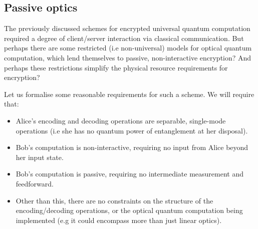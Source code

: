 \documentclass[aps,rmp,twocolumn,amsmath,amssymb,nofootinbib,superscriptaddress,longbibliography,floatfix,table-of-contents,eqsecnum]{revtex4-1}
\begin{document}
\subsection{Passive optics} 

The previously discussed schemes for encrypted universal quantum computation required a degree of client/server interaction via classical communication. But perhaps there are some restricted (i.e non-universal) models for optical quantum computation, which lend themselves to passive, non-interactive encryption? And perhaps these restrictions simplify the physical resource requirements for encryption?

Let us formalise some reasonable requirements for such a scheme. We will require that:
\begin{itemize}
\item Alice's encoding and decoding operations are separable, single-mode operations (i.e she has no quantum power of entanglement at her disposal).
\item Bob's computation is non-interactive, requiring no input from Alice beyond her input state.
\item Bob's computation is passive, requiring no intermediate measurement and feedforward.
\item Other than this, there are no constraints on the structure of the encoding/decoding operations, or the optical quantum computation being implemented (e.g it could encompass more than just linear optics).
\end{itemize}
\end{document}
